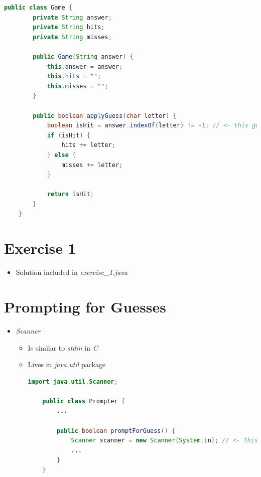 \documentclass[12pt]{article}
\begin{document}
    \begin{lstlisting}[language=Java,caption={lesson\_05/Game.java}]
    public class Game {
        private String answer;
        private String hits;
        private String misses;

        public Game(String answer) {
            this.answer = answer;
            this.hits = "";
            this.misses = "";
        }

        public boolean applyGuess(char letter) {
            boolean isHit = answer.indexOf(letter) != -1; // <- this guy here :)
            if (isHit) {
                hits += letter;
            } else {
                misses += letter;
            }

            return isHit;
        }
    }
    \end{lstlisting}

\bigskip

\section{Exercise 1}

\bigskip

\begin{itemize}
    \item Solution included in \textit{exercise\_1.java}
\end{itemize}

\bigskip

\section{Prompting for Guesses}

\bigskip

\begin{itemize}
    \item \textit{Scanner}
    \begin{itemize}
        \item Is similar to \textit{stdin} in \textit{C}
        \item Lives in \textit{java.util} package

    \begin{lstlisting}[language=Java,caption={lesson\_07/Prompter.java}]
    import java.util.Scanner;

    public class Prompter {
        ...

        public boolean promptForGuess() {
            Scanner scanner = new Scanner(System.in); // <- This little guy here :)
            ...
        }
    }
    \end{lstlisting}

    \end{itemize}
\end{itemize}
\end{document}
